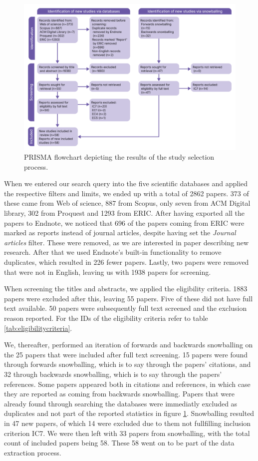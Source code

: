\begin{figure}[h!]
    \centering
    \includegraphics[width=\textwidth]{figures/PRISMA diagram.png}
    \caption{PRISMA flowchart depicting the results of the study selection process.}
    \label{fig:prisma-flowchart}
\end{figure}

When we entered our search query into the five scientific databases and applied the respective filters and limits, we ended up with a total of 2862 papers. 373 of these came from Web of science, 887 from Scopus, only seven from ACM Digital library, 302 from Proquest and 1293 from ERIC. After having exported all the papers to Endnote, we noticed that 696 of the papers coming from ERIC were marked as reports instead of journal articles, despite having set the \textit{Journal articles} filter. These were removed, as we are interested in paper describing new research. After that we used Endnote's built-in functionality to remove duplicates, which resulted in 226 fewer papers. Lastly, two papers were removed that were not in English, leaving us with 1938 papers for screening.

When screening the titles and abstracts, we applied the eligibility criteria. 1883 papers were excluded after this, leaving 55 papers. Five of these did not have full text available. 50 papers were subsequently full text screened and the exclusion reason reported. For the IDs of the eligibility criteria refer to table \ref{tab:eligibilitycriteria}.

We, thereafter, performed an iteration of forwards and backwards snowballing on the 25 papers that were included after full text screening. 15 papers were found through forwards snowballing, which is to say through the papers' citations, and 32 through backwards snowballing, which is to say through the papers' references. Some papers appeared both in citations and references, in which case they are reported as coming from backwards snowballing. Papers that were already found through searching the databases were immediatly excluded as duplicates and not part of the reported statistics in figure \ref{fig:prisma-flowchart}. Snowballing resulted in 47 new papers, of which 14 were excluded due to them not fullfilling inclusion criterion IC7. We were then left with 33 papers from snowballing, with the total count of included papers being 58. These 58 went on to be part of the data extraction process.

